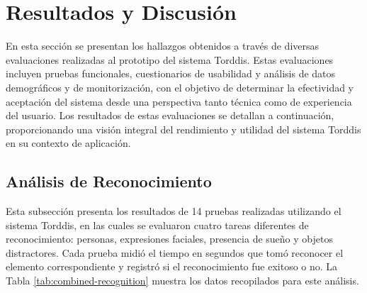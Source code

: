 \documentclass[a4paper,fleqn]{cas-sc}
\begin{document}
	\section{Resultados y Discusión}
	\label{seccion:Cinco}
		En esta sección se presentan los hallazgos obtenidos a través de diversas evaluaciones realizadas al prototipo del sistema Torddis. Estas evaluaciones incluyen pruebas funcionales, cuestionarios de usabilidad y análisis de datos demográficos y de monitorización, con el objetivo de determinar la efectividad y aceptación del sistema desde una perspectiva tanto técnica como de experiencia del usuario. Los resultados de estas evaluaciones se detallan a continuación, proporcionando una visión integral del rendimiento y utilidad del sistema Torddis en su contexto de aplicación.
	
		\subsection{Análisis de Reconocimiento}
			Esta subsección presenta los resultados de 14 pruebas realizadas utilizando el sistema Torddis, en las cuales se evaluaron cuatro tareas diferentes de reconocimiento: personas, expresiones faciales, presencia de sueño y objetos distractores. Cada prueba midió el tiempo en segundos que tomó reconocer el elemento correspondiente y registró si el reconocimiento fue exitoso o no. La Tabla \ref{tab:combined-recognition} muestra los datos recopilados para este análisis.
			
\end{document}
